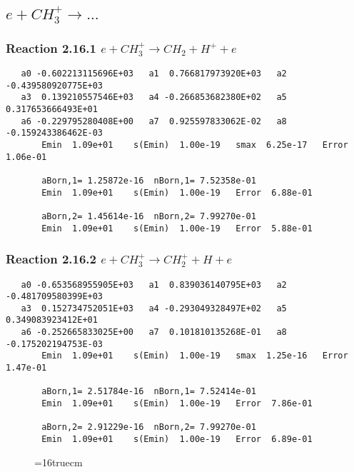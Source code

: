 \documentclass[12pt]{article}
\begin{document}
\subsection{ 
$e + CH_3^+ \rightarrow ... $
}

\subsubsection{
Reaction 2.16.1   $e + CH_3^+ \rightarrow CH_2 + H^+ + e$
}

\begin{small}\begin{verbatim} 
   a0 -0.602213115696E+03   a1  0.766817973920E+03   a2 -0.439580920775E+03
   a3  0.139210557546E+03   a4 -0.266853682380E+02   a5  0.317653666493E+01
   a6 -0.229795280408E+00   a7  0.925597833062E-02   a8 -0.159243386462E-03
       Emin  1.09e+01    s(Emin)  1.00e-19   smax  6.25e-17   Error  1.06e-01
 
       aBorn,1= 1.25872e-16  nBorn,1= 7.52358e-01
       Emin  1.09e+01    s(Emin)  1.00e-19   Error  6.88e-01
 
       aBorn,2= 1.45614e-16  nBorn,2= 7.99270e-01
       Emin  1.09e+01    s(Emin)  1.00e-19   Error  5.88e-01
\end{verbatim}\end{small}

\subsubsection{
Reaction 2.16.2   $e + CH_3^+ \rightarrow CH_2^+ + H + e$
}

\begin{small}\begin{verbatim} 
   a0 -0.653568955905E+03   a1  0.839036140795E+03   a2 -0.481709580399E+03
   a3  0.152734752051E+03   a4 -0.293049328497E+02   a5  0.349083923412E+01
   a6 -0.252665833025E+00   a7  0.101810135268E-01   a8 -0.175202194753E-03
       Emin  1.09e+01    s(Emin)  1.00e-19   smax  1.25e-16   Error  1.47e-01
 
       aBorn,1= 2.51784e-16  nBorn,1= 7.52414e-01
       Emin  1.09e+01    s(Emin)  1.00e-19   Error  7.86e-01
 
       aBorn,2= 2.91229e-16  nBorn,2= 7.99270e-01
       Emin  1.09e+01    s(Emin)  1.00e-19   Error  6.89e-01
\end{verbatim}\end{small}

\begin{figure} \label{met.1_2.16}
\epsfxsize=16truecm
\end{figure}
\newpage
 
\end{document}
